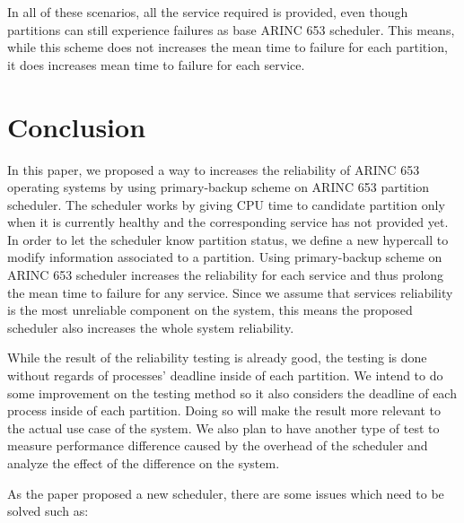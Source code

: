 \documentclass[conference]{IEEEtran}
\begin{document}
In all of these scenarios, all the service required is provided, even though partitions can
still experience failures as base ARINC 653 scheduler. This means, while this scheme does not
increases the mean time to failure for each partition, it does increases mean time to failure
for each service. 

\section{Conclusion}

In this paper, we proposed a way to increases the reliability of ARINC 653 operating systems by
using primary-backup scheme on ARINC 653 partition scheduler. The scheduler works by giving CPU
time to candidate partition only when it is currently healthy and the corresponding service has
not provided yet. In order to let the scheduler know partition status, we define a new hypercall
to modify information associated to a partition. Using primary-backup scheme on ARINC 653
scheduler increases the reliability for each service and thus prolong the mean time to failure
for any service. Since we assume that services reliability is the most unreliable component on the
system, this means the proposed scheduler also increases the whole system reliability.

While the result of the reliability testing is already good, the testing is done without regards
of processes' deadline inside of each partition. We intend to do some improvement on the testing
method so it also considers the deadline of each process inside of each partition. Doing so will
make the result more relevant to the actual use case of the system. We also plan to have
another type of test to measure performance difference caused by the overhead of the scheduler
and analyze the effect of the difference on the system.

As the paper proposed a new scheduler, there are some issues which need to be solved such as:
\end{document}
